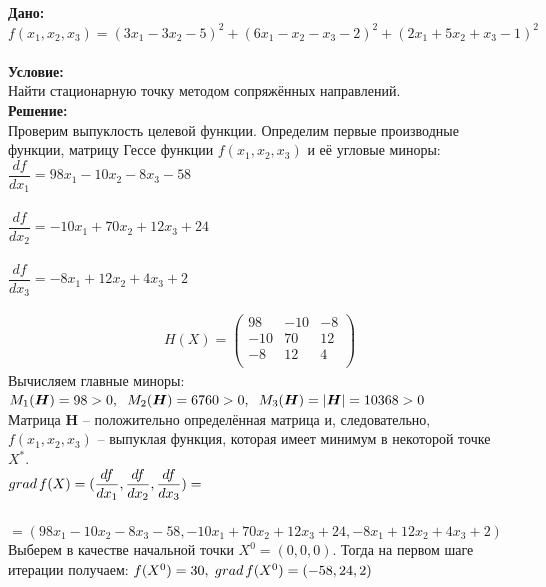 \documentclass[14pt,a4paper,fleqn]{extarticle}
\begin{document}
	\textbf{Дано:}\\
	$f(x_1,x_2,x_3) = (3x_1-3x_2-5)^2 + (6x_1-x_2-x_3-2)^2+(2x_1+5x_2+x_3-1)^2$\\\\
	\textbf{Условие:}\\
	Найти стационарную точку методом сопряжённых направлений.\\
	
	\textbf{Решение:}\\
	Проверим выпуклость целевой функции. Определим первые производные функции, матрицу Гессе функции $f(x_1,x_2,x_3)$ и её угловые миноры:\\
	
	$\dfrac{df}{dx_1} = 98x_1 - 10x_2 - 8x_3 - 58$\\\\
	$\dfrac{df}{dx_2} = -10x_1 + 70x_2 + 12x_3 + 24$\\\\
	$\dfrac{df}{dx_3} = -8x_1 + 12x_2 + 4x_3 + 2$
	
	\begin{align*}
		H(X) = \begin{pmatrix}
			98 & -10 & -8\\
			-10 & 70 & 12\\
			-8 & 12 & 4\\
		\end{pmatrix}
	\end{align*}
	Вычисляем главные миноры:\\
	$M_1(\boldsymbol{H}) = 98 > 0, \hspace*{0.2cm} M_2(\boldsymbol{H}) = 6760 > 0, \hspace*{0.2cm} M_3(\boldsymbol{H}) = |\boldsymbol{H}| = 10368 > 0$\\
	
	Матрица \textbf{H} -- положительно определённая матрица и, следовательно, $f(x_1, x_2, x_3)$ -- выпуклая функция, которая имеет минимум в некоторой точке $X^*$.\\
	
	$grad\hspace*{0.05cm}f(X) = (\dfrac{df}{dx_1}, \dfrac{df}{dx_2}, \dfrac{df}{dx_3}) =$\\\\
	$= (98x_1 - 10x_2 - 8x_3 - 58, -10x_1 + 70x_2 + 12x_3 + 24, -8x_1 + 12x_2 + 4x_3 + 2)$\\
	
	Выберем в качестве начальной точки $X^0 = (0,0,0)$. Тогда на первом шаге итерации получаем:
	\newpage
	$f(X^0) = 30, \hspace*{0.1cm} grad\hspace*{0.05cm}f(X^0) = (-58,24,2)$\\
	
\end{document}
